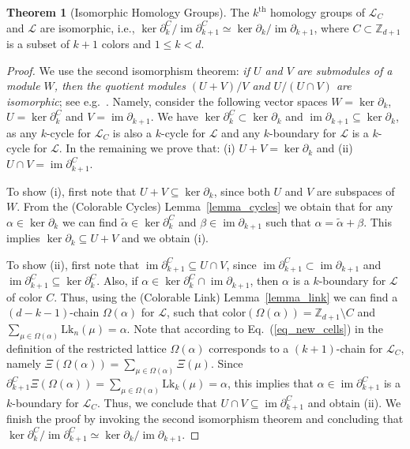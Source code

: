 \documentclass[onecolumn,letterpaper,11pt,accepted=2022-12-19]{quantumarticle}
\newcommand{\link}[2]{{\mathrm{Lk}_{#1}(#2)}}
\DeclareMathOperator{\im}{im}
\newcommand{\col}[1]{{\mathrm{color}(#1)}}
\theoremstyle{definition}
\theoremstyle{lemma}
\newtheorem{theorem}{Theorem}
\theoremstyle{theorem}
\theoremstyle{corollary}
\begin{document}
{\begin{theorem}[Isomorphic Homology Groups]
\label{thm_homology}
The $k^{\textrm{th}}$ homology groups of $\mathcal{L}_C$ and $\mathcal{L}$ are isomorphic, i.e.,
$\ker \partial_{k}^C / \im \partial_{k+1}^C \simeq \ker \partial_{k} / \im \partial_{k+1}$, where $C\subset\mathbb Z_{d+1}$ is a subset of $k+1$ colors and $1\leq k<d$.
\end{theorem}


\begin{proof}
We use the second isomorphism theorem:
\emph{if $U$ and $V$ are submodules of a module $W$, then the quotient modules $(U+V)/V$ and $U/(U\cap V)$ are isomorphic}; see e.g.~\cite{Lang2002}.
Namely, consider the following vector spaces $W = \ker\partial_k$, $U = \ker\partial^C_k$ and $V = \im\partial_{k+1}$.
We have $\ker \partial_k^C \subset \ker\partial_k$ and $\im \partial_{k+1} \subseteq \ker\partial_k$, as any $k$-cycle for $\mathcal{L}_C$ is also a $k$-cycle for $\mathcal{L}$ and any $k$-boundary for $\mathcal{L}$ is a $k$-cycle for $\mathcal{L}$.
In the remaining we prove that: (i) $U + V = \ker\partial_k$ and (ii) $ U \cap V = \im\partial^C_{k+1} $.


To show (i), first note that $U + V \subseteq \ker\partial_k$, since both $U$ and $V$ are subspaces of $W$.
From the (Colorable Cycles) Lemma~\ref{lemma_cycles} we obtain that for any $\alpha\in\ker\partial_k$ we can find $\widetilde\alpha\in\ker\partial^C_{k}$ and $\beta\in\im\partial_{k+1}$ such that $\alpha = \widetilde\alpha + \beta$.
This implies $\ker\partial_k \subseteq U + V$ and we obtain (i).


To show (ii), first note that $\im\partial_{k+1}^C \subseteq U\cap V$, since $\im\partial_{k+1}^C\subset \im\partial_{k+1}$ and $\im\partial_{k+1}^C\subseteq \ker\partial_{k}^C$.
Also, if $\alpha\in\ker\partial^C_k\cap \im\partial_{k+1}$, then $\alpha$ is a $k$-boundary for $\mathcal{L}$ of color $C$.
Thus, using the (Colorable Link) Lemma~\ref{lemma_link} we can find a $(d-k-1)$-chain $\Omega(\alpha)$ for $\mathcal{L}$, such that $\col{\Omega(\alpha)} = \mathbb{Z}_{d+1}\setminus C$ and $\sum_{\mu \in \Omega(\alpha)} \link n \mu = \alpha$.
Note that according to Eq.~(\ref{eq_new_cells}) in the definition of the restricted lattice $\Omega(\alpha)$ corresponds to a $(k+1)$-chain for $\mathcal{L}_C$, namely
$\Xi(\Omega(\alpha)) = \sum_{\mu \in\Omega(\alpha)} \Xi(\mu)$.
Since $\partial_{k+1}^C \Xi(\Omega(\alpha)) = \sum_{\mu \in\Omega(\alpha)} \link k \mu = \alpha$, this implies that $\alpha\in\im\partial_{k+1}^C$ is a $k$-boundary for $\mathcal{L}_C$.
Thus, we conclude that $U\cap V \subseteq \im\partial_{k+1}^C$ and obtain (ii).
We finish the proof by invoking the second isomorphism theorem and concluding that $\ker \partial_{k}^C / \im \partial_{k+1}^C \simeq \ker \partial_{k} / \im \partial_{k+1}$.
\end{proof}


}
\end{document}
